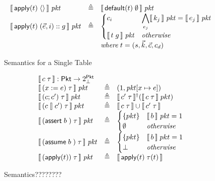 \begin{figure}[ht]
  \[\begin{array}{lcl}
      \llbracket\,\mathsf{apply}(t)\; \langle\rangle\,\rrbracket\; \mathit{pkt}
      &\triangleq& \llbracket\,\mathsf{default}(t)\; \emptyset\,\rrbracket\; \mathit{pkt} \\
      \llbracket\,\mathsf{apply}(t)\; (\vec e, i)::g\,\rrbracket\; \mathit{pkt}
      &\triangleq& \begin{cases}
        c_i & \displaystyle \bigwedge_{e_j} \llbracket\,k_j\,\rrbracket\; \mathit{pkt} = \llbracket\,e_j\,\rrbracket\; \mathit{pkt} \\
        \llbracket\,t\; g\,\rrbracket\; \mathit{pkt} & \mathit{otherwise}
      \end{cases}\\
      && \mathit{where}\; t = (s, \vec k, \vec c, c_d)
    \end{array}\]
  \caption{Semantics for a Single Table}
  \label{fig:tablesemantics}
\end{figure}


\begin{figure}[ht]
  \[\begin{array}{lcl}
      \multicolumn 3 l {\bracbb{c\; \tau} : \Pkt \to 2^\Pkt_\bot} \\
      \bracbb{(x:=e)\; \tau}\; \pkt & \triangleq & (1,\pkt[x \mapsto e]) \\
      \bracbb{(c;c')\; \tau}\; \pkt & \triangleq & \bracbb{c'\; \tau}^\dag(\bracbb{c\; \tau}\; pkt) \\
      \bracbb{(c\angel c')\; \tau}\; pkt &\triangleq& \bracbb{c\; \tau} \cup \bracbb{c'\; \tau} \\
      \bracbb{(\assert b)\; \tau}\; \pkt &\triangleq& \begin{cases}
        \{pkt\}   & \bracbb{b}\; \pkt = \TRUE \\
        \emptyset & \mathit{otherwise}
      \end{cases} \\
      \bracbb{(\assume b)\; \tau}\; \pkt &\triangleq& \begin{cases}
        \{pkt\} & \bracbb{b}\; pkt = \TRUE \\
        \bot    & \mathit{otherwise}
      \end{cases} \\
      \bracbb{(\apply t)\; \tau}\; \pkt &\triangleq& \bracbb{\apply t\; \tau(t)}
    \end{array}\]
  
  \caption{Semantics????????}
  \label{fig:semantics}

\end{figure}

